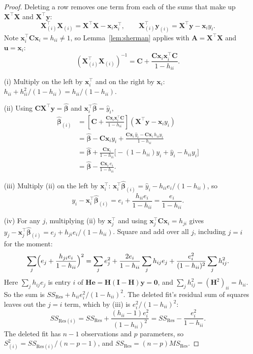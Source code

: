 \documentclass[11pt,a4paper]{article}
\numberwithin{equation}{section}
\theoremstyle{definition}
\begin{document}
\begin{proof}
Deleting a row removes one term from each of the sums that make up $\mathbf{X}^\top\mathbf{X}$
and $\mathbf{X}^\top\mathbf{y}$:
\[
\mathbf{X}_{(i)}^\top\mathbf{X}_{(i)} = \mathbf{X}^\top\mathbf{X} - \mathbf{x}_i\mathbf{x}_i^\top ,
\qquad
\mathbf{X}_{(i)}^\top\mathbf{y}_{(i)} = \mathbf{X}^\top\mathbf{y} - \mathbf{x}_i y_i .
\]
Note $\mathbf{x}_i^\top\mathbf{C}\mathbf{x}_i = h_{ii} \neq 1$, so Lemma~\ref{lem:sherman}
applies with $\mathbf{A} = \mathbf{X}^\top\mathbf{X}$ and $\mathbf{u} = \mathbf{x}_i$:
\[
(\mathbf{X}_{(i)}^\top\mathbf{X}_{(i)})^{-1} = \mathbf{C} + \frac{\mathbf{C}\mathbf{x}_i\mathbf{x}_i^\top\mathbf{C}}{1 - h_{ii}} .
\]

(i) Multiply on the left by $\mathbf{x}_i^\top$ and on the right by $\mathbf{x}_i$:
$h_{ii} + h_{ii}^2/(1 - h_{ii}) = h_{ii}/(1 - h_{ii})$.

(ii) Using $\mathbf{C}\mathbf{X}^\top\mathbf{y} = \hat{\boldsymbol\beta}$ and
$\mathbf{x}_i^\top\hat{\boldsymbol\beta} = \hat y_i$,
\begin{align*}
\hat{\boldsymbol\beta}_{(i)}
&= \left[\mathbf{C} + \frac{\mathbf{C}\mathbf{x}_i\mathbf{x}_i^\top\mathbf{C}}{1 - h_{ii}}\right](\mathbf{X}^\top\mathbf{y} - \mathbf{x}_i y_i) \\
&= \hat{\boldsymbol\beta} - \mathbf{C}\mathbf{x}_i y_i
 + \frac{\mathbf{C}\mathbf{x}_i\,\hat y_i - \mathbf{C}\mathbf{x}_i\, h_{ii} y_i}{1 - h_{ii}} \\
&= \hat{\boldsymbol\beta} + \frac{\mathbf{C}\mathbf{x}_i}{1 - h_{ii}}
 \bigl[-(1 - h_{ii})y_i + \hat y_i - h_{ii}y_i\bigr] \\
&= \hat{\boldsymbol\beta} - \frac{\mathbf{C}\mathbf{x}_i\, e_i}{1 - h_{ii}} .
\end{align*}

(iii) Multiply (ii) on the left by $\mathbf{x}_i^\top$:
$\mathbf{x}_i^\top\hat{\boldsymbol\beta}_{(i)} = \hat y_i - h_{ii}e_i/(1 - h_{ii})$, so
\[
y_i - \mathbf{x}_i^\top\hat{\boldsymbol\beta}_{(i)} = e_i + \frac{h_{ii}e_i}{1 - h_{ii}} = \frac{e_i}{1 - h_{ii}} .
\]

(iv) For any $j$, multiplying (ii) by $\mathbf{x}_j^\top$ and using
$\mathbf{x}_j^\top\mathbf{C}\mathbf{x}_i = h_{ji}$ gives
$y_j - \mathbf{x}_j^\top\hat{\boldsymbol\beta}_{(i)} = e_j + h_{ji}e_i/(1 - h_{ii})$.
Square and add over all $j$, including $j = i$ for the moment:
\[
\sum_j \Bigl(e_j + \frac{h_{ji}e_i}{1 - h_{ii}}\Bigr)^2
= \sum_j e_j^2 + \frac{2e_i}{1 - h_{ii}}\sum_j h_{ij}e_j + \frac{e_i^2}{(1 - h_{ii})^2}\sum_j h_{ij}^2 .
\]
Here $\sum_j h_{ij}e_j$ is entry $i$ of $\mathbf{He} = \mathbf{H}(\mathbf{I} - \mathbf{H})\mathbf{y} = \mathbf{0}$,
and $\sum_j h_{ij}^2 = (\mathbf{H}^2)_{ii} = h_{ii}$. So the sum is
$SS_{\mathrm{Res}} + h_{ii}e_i^2/(1 - h_{ii})^2$. The deleted fit's residual sum of squares
leaves out the $j = i$ term, which by (iii) is $e_i^2/(1 - h_{ii})^2$:
\[
SS_{\mathrm{Res}(i)} = SS_{\mathrm{Res}} + \frac{(h_{ii} - 1)e_i^2}{(1 - h_{ii})^2}
= SS_{\mathrm{Res}} - \frac{e_i^2}{1 - h_{ii}} .
\]
The deleted fit has $n - 1$ observations and $p$ parameters, so
$S^2_{(i)} = SS_{\mathrm{Res}(i)}/(n - p - 1)$, and $SS_{\mathrm{Res}} = (n - p)MS_{\mathrm{Res}}$.
\end{proof}
\end{document}

